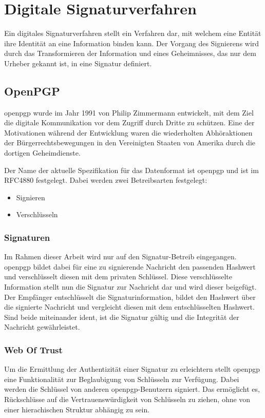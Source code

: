 \section{Digitale Signaturverfahren}
\label{sec:GrundlagenDefinitionen:DigitaleSignaturen:Verfahren}
Ein digitales Signaturverfahren stellt ein Verfahren dar, mit welchem eine Entität ihre Identität an eine Information binden kann. Der Vorgang des Signierens
wird durch das Transformieren der Information und eines Geheimnisses, das nur dem Urheber gekannt ist, in eine Signatur definiert\cite{hac}.

\subsection{OpenPGP}
\label{sec:GrundlagenDefinitionen:DigitaleSignaturen:Verfahren:openpgp}
\gls{openpgp} wurde im Jahr 1991 von Philip Zimmermann\cite{zimmermann:pgp} entwickelt, mit dem Ziel die digitale Kommunikation vor dem Zugriff durch Dritte zu
schützen. Eine der Motivationen während der Entwicklung waren die wiederholten Abhöraktionen der Bürgerrechtsbewegungen in den Vereinigten Staaten von Amerika
durch die dortigen Geheimdienste\cite{singh:messages}.

Der Name der aktuelle Spezifikation für das Datenformat ist \gls{openpgp} und ist im RFC4880\cite{openpgp:ietf} festgelegt. Dabei werden zwei Betreibsarten festgelegt:
\begin{itemize}
    \item Signieren
    \item Verschlüsseln
\end{itemize}

\subsubsection{Signaturen}
Im Rahmen dieser Arbeit wird nur auf den Signatur-Betreib eingegangen. \gls{openpgp} bildet dabei für eine zu signierende Nachricht den passenden Hashwert und
verschlüsselt diesen mit dem privaten Schlüssel. Diese verschlüsselte Information stellt nun die Signatur zur Nachricht dar und wird dieser beigefügt.
Der Empfänger entschlüsselt die Signaturinformation, bildet den Hashwert über die signierte Nachricht und vergleicht diesen mit dem entschlüsselten Hashwert.
Sind beide miteinander ident, ist die Signatur gültig und die Integrität der Nachricht gewährleistet.
\cite{hac}\cite{singh:messages}

\subsubsection{Web Of Trust}
Um die Ermittlung der Authentizität einer Signatur zu erleichtern stellt \gls{openpgp} eine Funktionalität zur Beglaubigung von Schlüsseln zur Verfügung. Dabei
werden die Schlüssel von anderen \gls{openpgp}-Benutzern signiert. Das ermöglicht es, Rückschlüsse auf die Vertrauenswürdigkeit von Schlüsseln zu ziehen, ohne
von einer hierachischen Struktur abhängig zu sein.\\

